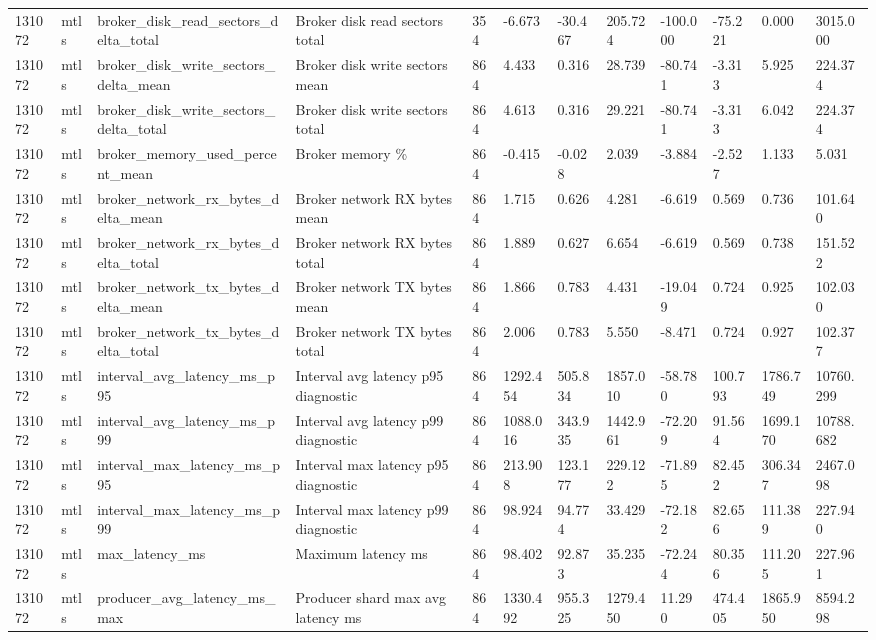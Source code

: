 \begin{longtable}{llllllllllll}
131072 & mtls & broker\_disk\_read\_sectors\_delta\_total & Broker disk read sectors total & 354 & -6.673 & -30.467 & 205.724 & -100.000 & -75.221 & 0.000 & 3015.000 \\
131072 & mtls & broker\_disk\_write\_sectors\_delta\_mean & Broker disk write sectors mean & 864 & 4.433 & 0.316 & 28.739 & -80.741 & -3.313 & 5.925 & 224.374 \\
131072 & mtls & broker\_disk\_write\_sectors\_delta\_total & Broker disk write sectors total & 864 & 4.613 & 0.316 & 29.221 & -80.741 & -3.313 & 6.042 & 224.374 \\
131072 & mtls & broker\_memory\_used\_percent\_mean & Broker memory \% & 864 & -0.415 & -0.028 & 2.039 & -3.884 & -2.527 & 1.133 & 5.031 \\
131072 & mtls & broker\_network\_rx\_bytes\_delta\_mean & Broker network RX bytes mean & 864 & 1.715 & 0.626 & 4.281 & -6.619 & 0.569 & 0.736 & 101.640 \\
131072 & mtls & broker\_network\_rx\_bytes\_delta\_total & Broker network RX bytes total & 864 & 1.889 & 0.627 & 6.654 & -6.619 & 0.569 & 0.738 & 151.522 \\
131072 & mtls & broker\_network\_tx\_bytes\_delta\_mean & Broker network TX bytes mean & 864 & 1.866 & 0.783 & 4.431 & -19.049 & 0.724 & 0.925 & 102.030 \\
131072 & mtls & broker\_network\_tx\_bytes\_delta\_total & Broker network TX bytes total & 864 & 2.006 & 0.783 & 5.550 & -8.471 & 0.724 & 0.927 & 102.377 \\
131072 & mtls & interval\_avg\_latency\_ms\_p95 & Interval avg latency p95 diagnostic & 864 & 1292.454 & 505.834 & 1857.010 & -58.780 & 100.793 & 1786.749 & 10760.299 \\
131072 & mtls & interval\_avg\_latency\_ms\_p99 & Interval avg latency p99 diagnostic & 864 & 1088.016 & 343.935 & 1442.961 & -72.209 & 91.564 & 1699.170 & 10788.682 \\
131072 & mtls & interval\_max\_latency\_ms\_p95 & Interval max latency p95 diagnostic & 864 & 213.908 & 123.177 & 229.122 & -71.895 & 82.452 & 306.347 & 2467.098 \\
131072 & mtls & interval\_max\_latency\_ms\_p99 & Interval max latency p99 diagnostic & 864 & 98.924 & 94.774 & 33.429 & -72.182 & 82.656 & 111.389 & 227.940 \\
131072 & mtls & max\_latency\_ms & Maximum latency ms & 864 & 98.402 & 92.873 & 35.235 & -72.244 & 80.356 & 111.205 & 227.961 \\
131072 & mtls & producer\_avg\_latency\_ms\_max & Producer shard max avg latency ms & 864 & 1330.492 & 955.325 & 1279.450 & 11.290 & 474.405 & 1865.950 & 8594.298 \\

\end{longtable}
